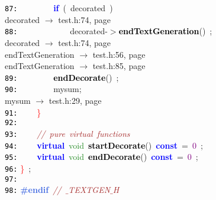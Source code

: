 \documentclass{article}
\begin{document}
\mbox{}\texttt{\textcolor{Black}{87:}} \ \ \ \ \ \ \ \ \textbf{\textcolor{Blue}{if}}\ \textcolor{BrickRed}{(}\ decorated\ \textcolor{BrickRed}{)} \\
\mbox{}{\hfill decorated $\rightarrow$ test.h:74, page~\pageref{test.h:74}} \\
\mbox{}\texttt{\textcolor{Black}{88:}} \ \ \ \ \ \ \ \ \ \ \ \ decorated\textcolor{BrickRed}{-$>$}\textbf{\textcolor{Black}{endTextGeneration}}\textcolor{BrickRed}{()}\ \textcolor{BrickRed}{;} \\
\mbox{}{\hfill decorated $\rightarrow$ test.h:74, page~\pageref{test.h:74}} \\
\mbox{}{\hfill endTextGeneration $\rightarrow$ test.h:56, page~\pageref{test.h:56}} \\
\mbox{}{\hfill endTextGeneration $\rightarrow$ test.h:85, page~\pageref{test.h:85}} \\
\mbox{}\texttt{\textcolor{Black}{89:}} \ \ \ \ \ \ \ \ \textbf{\textcolor{Black}{endDecorate}}\textcolor{BrickRed}{()}\ \textcolor{BrickRed}{;} \\
\mbox{}\texttt{\textcolor{Black}{90:}} \ \ \ \ \ \ \ \ mysum\textcolor{BrickRed}{;} \\
\mbox{}{\hfill mysum $\rightarrow$ test.h:29, page~\pageref{test.h:29}} \\
\mbox{}\texttt{\textcolor{Black}{91:}} \ \ \ \ \textcolor{Red}{\}} \\
\mbox{}\texttt{\textcolor{Black}{92:}}  \\
\mbox{}\texttt{\textcolor{Black}{93:}} \ \ \ \ \textit{\textcolor{Brown}{//\ pure\ virtual\ functions}} \\
\mbox{}\texttt{\textcolor{Black}{94:}} \ \ \ \ \textbf{\textcolor{Blue}{virtual}}\ \textcolor{ForestGreen}{void}\ \textbf{\textcolor{Black}{startDecorate}}\textcolor{BrickRed}{()}\ \textbf{\textcolor{Blue}{const}}\ \textcolor{BrickRed}{=}\ \textcolor{Purple}{0}\ \textcolor{BrickRed}{;} \\
\mbox{}\texttt{\textcolor{Black}{95:}} \ \ \ \ \textbf{\textcolor{Blue}{virtual}}\ \textcolor{ForestGreen}{void}\ \textbf{\textcolor{Black}{endDecorate}}\textcolor{BrickRed}{()}\ \textbf{\textcolor{Blue}{const}}\ \textcolor{BrickRed}{=}\ \textcolor{Purple}{0}\ \textcolor{BrickRed}{;} \\
\mbox{}\texttt{\textcolor{Black}{96:}} \textcolor{Red}{\}}\ \textcolor{BrickRed}{;} \\
\mbox{}\texttt{\textcolor{Black}{97:}}  \\
\mbox{}\texttt{\textcolor{Black}{98:}} \textbf{\textcolor{RoyalBlue}{\#endif}}\ \textit{\textcolor{Brown}{//\ $\_$TEXTGEN$\_$H}} \\
\end{document}
